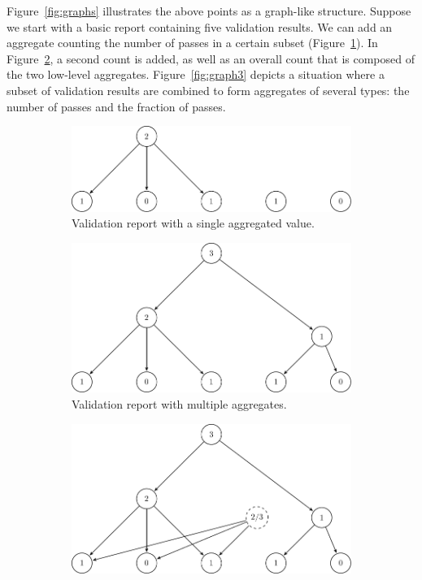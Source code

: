 Figure~\ref{fig:graphs} illustrates the above points as a graph-like structure.
Suppose we start with a basic report containing five validation results. We can
add an aggregate counting the number of passes in a certain subset
(Figure~\ref{fig:graph1}).  In Figure~\ref{fig:graph2}, a second count is
added, as well as an overall count that is composed of the two low-level
aggregates. Figure~\ref{fig:graph3} depicts a situation where a subset of
validation results are combined to form aggregates of several types: the number
of passes and the fraction of passes.
%
\begin{figure}[!t]
  \centering
  \begin{subfigure}[b]{0.7\textwidth}
    \includegraphics[width=\textwidth]{fig/graph1.pdf}
    \caption{Validation report with a single aggregated value.}
    \label{fig:graph1}
  \end{subfigure}
  \begin{subfigure}[b]{0.7\textwidth}
    \includegraphics[width=\textwidth]{fig/graph2.pdf}
    \caption{Validation report with multiple aggregates.}
    \label{fig:graph2}
  \end{subfigure}
  \begin{subfigure}[b]{0.7\textwidth}
    \includegraphics[width=\textwidth]{fig/graph3.pdf}

\end{subfigure}
\end{figure}
